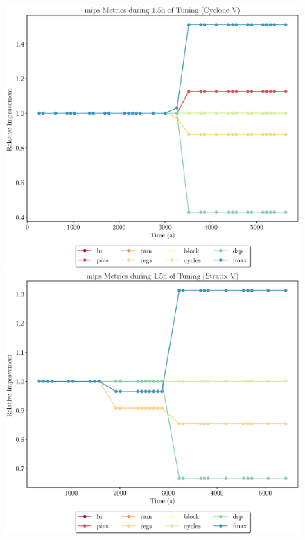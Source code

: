 \documentclass[12pt, a4paper]{article}
\begin{document}
\begin{figure}[htpb]
    \begin{minipage}{.48\textwidth}
        \includegraphics[scale=.25]{mips_all_5400_chstone_CycloneV}
    \end{minipage}%
    \hfill
    \begin{minipage}{.48\textwidth}
        \includegraphics[scale=.25]{mips_all_5400_chstone_StratixV}
    \end{minipage}%
\end{figure}
\end{document}
